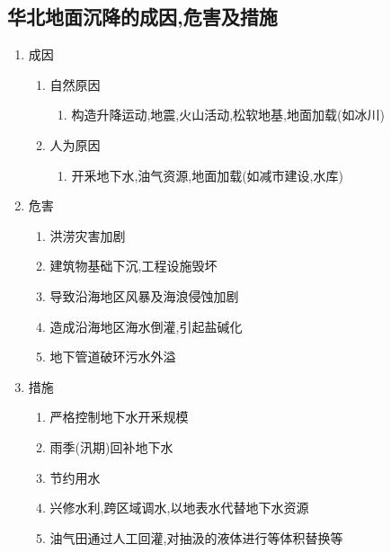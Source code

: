\documentclass[a4paper]{article}
\begin{document}
    \subsection{华北地面沉降的成因,危害及措施}
    \begin{enumerate}
        \item 成因
        \begin{enumerate}
            \item 自然原因
            \begin{enumerate}
                \item 构造升降运动,地震,火山活动,松软地基,地面加载(如冰川)
            \end{enumerate}
            \item 人为原因
            \begin{enumerate}
                \item 开釆地下水,油气资源,地面加载(如减市建设,水库)
            \end{enumerate}
        \end{enumerate}
        \item 危害
        \begin{enumerate}
            \item 洪涝灾害加剧
            \item 建筑物基础下沉,工程设施毁坏
            \item 导致沿海地区风暴及海浪侵蚀加剧
            \item 造成沿海地区海水倒灌,引起盐碱化
            \item 地下管道破环污水外溢
        \end{enumerate}
        \item 措施
        \begin{enumerate}
            \item 严格控制地下水开釆规模
            \item 雨季(汛期)回补地下水
            \item 节约用水
            \item 兴修水利,跨区域调水,以地表水代替地下水资源
            \item 油气田通过人工回灌,对抽汲的液体进行等体积替换等
        \end{enumerate}
    \end{enumerate}
\end{document}
